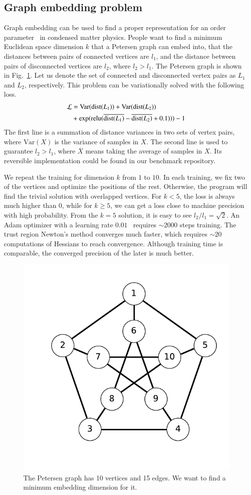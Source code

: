 \documentclass{article}
\let\oldsim\sim
\renewcommand{\sim}{{\oldsim}}
\newcommand{\<}{\langle}
\renewcommand{\>}{\rangle}
\newcommand{\Var}{{\mathrm{Var}}}
\renewcommand{\cite}[1]{{\citep{#1}}}
\newcommand{\Fig}[1]{Fig.~\ref{#1}}
\theoremstyle{definition}\newtheorem{definition}{\textit{Definition}}
\begin{document}
\subsection{Graph embedding problem}\label{sec:graphbench}
Graph embedding can be used to find a proper representation for an order parameter~\cite{Takahashi2020} in condensed matter physics. People want to find a minimum Euclidean space dimension $k$ that a Petersen graph can embed into, that the distances between pairs of connected vertices are $l_1$, and the distance between pairs of disconnected vertices are $l_2$, where $l_2 > l_1$.
The Petersen graph is shown in \Fig{fig:petersen}.
Let us denote the set of connected and disconnected vertex pairs as $L_1$ and $L_2$, respectively. This problem can be variationally solved with the following loss.
\begin{align}
    \begin{split}
        \mathcal{L} &= \Var({\rm dist}(L_1)) + \Var({\rm dist}(L_2)) \\
        &+\exp({\rm relu}(\overline{{\rm dist}(L_1)} - \overline{{\rm dist}(L_2)} + 0.1))) - 1
    \end{split}
\end{align}
The first line is a summation of distance variances in two sets of vertex pairs, where $\Var(X)$ is the variance of samples in $X$.
The second line is used to guarantee $l_2 > l_1$, where $\overline{X}$ means taking the average of samples in $X$.
Its reversible implementation could be found in our benchmark repository.

We repeat the training for dimension $k$ from $1$ to $10$.
In each training, we fix two of the vertices and optimize the positions of the rest. Otherwise, the program will find the trivial solution with overlapped vertices. 
For $k < 5$, the loss is always much higher than $0$,
while for $k\geq5$, we can get a loss close to machine precision with high probability.
From the $k=5$ solution, it is easy to see $l_2/l_1 = \sqrt{2}$.
An Adam optimizer with a learning rate $0.01$~\cite{Kingma2014} requires $\sim2000$ steps training.
The trust region Newton's method converges much faster, which requires $\sim 20$ computations of Hessians to reach convergence.
Although training time is comparable, the converged precision of the later is much better.
\begin{figure}
    \centerline{\includegraphics[width=0.4\columnwidth,trim={0 1cm 0 0},clip]{petersen.pdf}}
    \caption{The Petersen graph has 10 vertices and 15 edges. We want to find a minimum embedding dimension for it.}\label{fig:petersen}
\end{figure}
\end{document}
